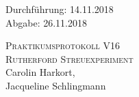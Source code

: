 

\begin{titlepage}
  \begin{flushleft}
 Durchführung: 14.11.2018\\
 Abgabe: 26.11.2018\\
  \end{flushleft}



 \begin{center}


\textsc{\LARGE Praktikumsprotokoll V16}\\[1.5cm]
\textsc{\huge Rutherford Streuexperiment} \\[5,5cm]

Carolin Harkort\footnotemark[1], \\
Jacqueline Schlingmann\footnotemark[2] \\[1,0cm]



 \end{center}

 \vfill

\end{titlepage}


  
  

\nocite{*}
\printbibliography

